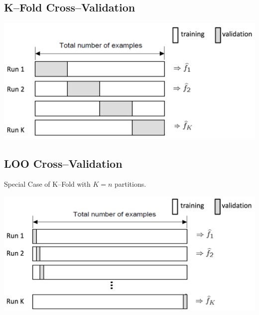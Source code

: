 \documentclass[18pt,a3paper,landscape, ncols=3]{cheatsheet}
\begin{document}
		\subsection{K--Fold Cross--Validation}
			\begin{mdframed}
				\begin{minipage}{.5\textwidth}
				\end{minipage}%
				\begin{minipage}{.5\textwidth}
					\includegraphics{K_fold_cross_validation.png}
				\end{minipage}
			\end{mdframed}
		\subsection{LOO Cross--Validation}
			\begin{mdframed}
				\begin{minipage}{.5\textwidth}
					Special Case of K--Fold with \(K=n\) partitions.\\
				\end{minipage}%
				\begin{minipage}{.5\textwidth}
					\includegraphics{LOO_cross_validation.png}
				\end{minipage}
			\end{mdframed}
\end{document}
